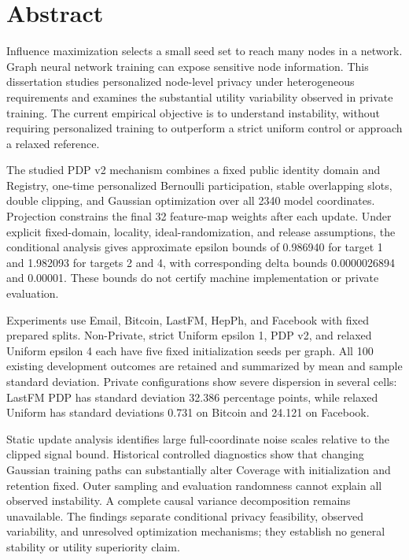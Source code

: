 \chapter*{Abstract}
Influence maximization selects a small seed set to reach many nodes in a network. Graph neural network training can expose sensitive node information. This dissertation studies personalized node-level privacy under heterogeneous requirements and examines the substantial utility variability observed in private training. The current empirical objective is to understand instability, without requiring personalized training to outperform a strict uniform control or approach a relaxed reference.

The studied PDP v2 mechanism combines a fixed public identity domain and Registry, one-time personalized Bernoulli participation, stable overlapping slots, double clipping, and Gaussian optimization over all 2340 model coordinates. Projection constrains the final 32 feature-map weights after each update. Under explicit fixed-domain, locality, ideal-randomization, and release assumptions, the conditional analysis gives approximate epsilon bounds of 0.986940 for target 1 and 1.982093 for targets 2 and 4, with corresponding delta bounds 0.0000026894 and 0.00001. These bounds do not certify machine implementation or private evaluation.

Experiments use Email, Bitcoin, LastFM, HepPh, and Facebook with fixed prepared splits. Non-Private, strict Uniform epsilon 1, PDP v2, and relaxed Uniform epsilon 4 each have five fixed initialization seeds per graph. All 100 existing development outcomes are retained and summarized by mean and sample standard deviation. Private configurations show severe dispersion in several cells: LastFM PDP has standard deviation 32.386 percentage points, while relaxed Uniform has standard deviations 0.731 on Bitcoin and 24.121 on Facebook.

Static update analysis identifies large full-coordinate noise scales relative to the clipped signal bound. Historical controlled diagnostics show that changing Gaussian training paths can substantially alter Coverage with initialization and retention fixed. Outer sampling and evaluation randomness cannot explain all observed instability. A complete causal variance decomposition remains unavailable. The findings separate conditional privacy feasibility, observed variability, and unresolved optimization mechanisms; they establish no general stability or utility superiority claim.
\clearpage
